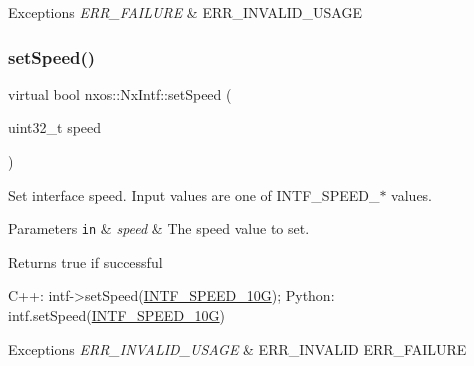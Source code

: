 \begin{DoxyExceptions}{Exceptions}
{\em E\+R\+R\+\_\+\+F\+A\+I\+L\+U\+RE} & E\+R\+R\+\_\+\+I\+N\+V\+A\+L\+I\+D\+\_\+\+U\+S\+A\+GE \\
\hline
\end{DoxyExceptions}
\mbox{\label{classnxos_1_1_nx_intf_ad42e229fc4c3aa9111b3a8805d55588c}} 
\subsubsection{\texorpdfstring{set\+Speed()}{setSpeed()}}
{\footnotesize\ttfamily virtual bool nxos\+::\+Nx\+Intf\+::set\+Speed (\begin{DoxyParamCaption}\item[{uint32\+\_\+t}]{speed }\end{DoxyParamCaption})\hspace{0.3cm}{\ttfamily [pure virtual]}}

Set interface speed. Input values are one of I\+N\+T\+F\+\_\+\+S\+P\+E\+E\+D\+\_\+$\ast$ values. 
\begin{DoxyParams}[1]{Parameters}
\mbox{\tt in}  & {\em speed} & The speed value to set. \\
\hline
\end{DoxyParams}
\begin{DoxyReturn}{Returns}
true if successful
\end{DoxyReturn}

\begin{DoxyCode}
C++:
    intf->setSpeed(\mbox{\hyperlink{nx__intf__mgr_8h_abf3b93884b7b103f9c3d98e9a3c109de}{INTF\_SPEED\_10G}});
Python:
    intf.setSpeed(\mbox{\hyperlink{nx__intf__mgr_8h_abf3b93884b7b103f9c3d98e9a3c109de}{INTF\_SPEED\_10G}})
\end{DoxyCode}



\begin{DoxyExceptions}{Exceptions}
{\em E\+R\+R\+\_\+\+I\+N\+V\+A\+L\+I\+D\+\_\+\+U\+S\+A\+GE} & E\+R\+R\+\_\+\+I\+N\+V\+A\+L\+ID E\+R\+R\+\_\+\+F\+A\+I\+L\+U\+RE \\
\hline
\end{DoxyExceptions}
\mbox{\label{classnxos_1_1_nx_intf_af5d5c584845fe42bea0d1d40f9907065}} 
